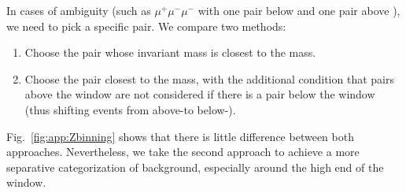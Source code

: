 In cases of ambiguity (such as $\mu^+\mu^-\mu^-$ with one pair below and one pair above \Z), we need to pick a specific pair. We compare two methods:
\begin{enumerate}
	\item Choose the pair whose invariant mass is closest to the \Z mass.
	\item Choose the pair closest to the \Z mass, with the additional condition that pairs above the \Z window are not considered if there is a pair below the \Z window (thus shifting events from above-\Z to below-\Z).
\end{enumerate}
Fig.~\ref{fig:app:Zbinning} shows that there is little difference between both approaches. Nevertheless, we take the second approach to achieve a more separative categorization of background, especially around the high end of the \Z window.
